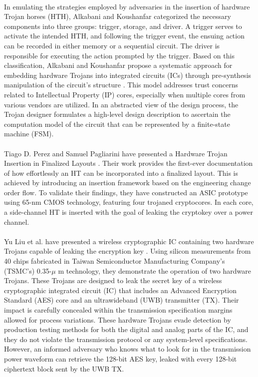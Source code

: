 \paragraph*{}
In emulating the strategies employed by adversaries in the insertion of hardware Trojan horses (HTH), Alkabani and Koushanfar categorized the necessary components into three groups: trigger, storage, and driver. A trigger serves to activate the intended HTH, and following the trigger event, the ensuing action can be recorded in either memory or a sequential circuit. The driver is responsible for executing the action prompted by the trigger. Based on this classification, Alkabani and Koushanfar propose a systematic approach for embedding hardware Trojans into integrated circuits (ICs) through pre-synthesis manipulation of the circuit's structure \cite{4559059}. This model addresses trust concerns related to Intellectual Property (IP) cores, especially when multiple cores from various vendors are utilized. In an abstracted view of the design process, the Trojan designer formulates a high-level design description to ascertain the computation model of the circuit that can be represented by a finite-state machine (FSM).
\paragraph*{}
Tiago D. Perez and Samuel Pagliarini have presented a Hardware Trojan Insertion in Finalized Layouts \cite{9956883}. Their work provides the first-ever documentation of how effortlessly an HT can be incorporated into a finalized layout. This is achieved by introducing an insertion framework based on the engineering change order flow. To validate their findings, they have constructed an ASIC prototype using 65-nm CMOS technology, featuring four trojaned cryptocores. In each core, a side-channel HT is inserted with the goal of leaking the cryptokey over a power channel.
\paragraph*{}
Yu Liu et al. have presented a wireless cryptographic IC containing two hardware Trojans capable of leaking the encryption key \cite{7792718}. Using silicon measurements from 40 chips fabricated in Taiwan Semiconductor Manufacturing Company's (TSMC's) 0.35-$\mu$ m technology, they demonstrate the operation of two hardware Trojans. These Trojans are designed to leak the secret key of a wireless cryptographic integrated circuit (IC) that includes an Advanced Encryption Standard (AES) core and an ultrawideband (UWB) transmitter (TX). Their impact is carefully concealed within the transmission specification margins allowed for process variations. These hardware Trojans evade detection by production testing methods for both the digital and analog parts of the IC, and they do not violate the transmission protocol or any system-level specifications. However, an informed adversary who knows what to look for in the transmission power waveform can retrieve the 128-bit AES key, leaked with every 128-bit ciphertext block sent by the UWB TX.
